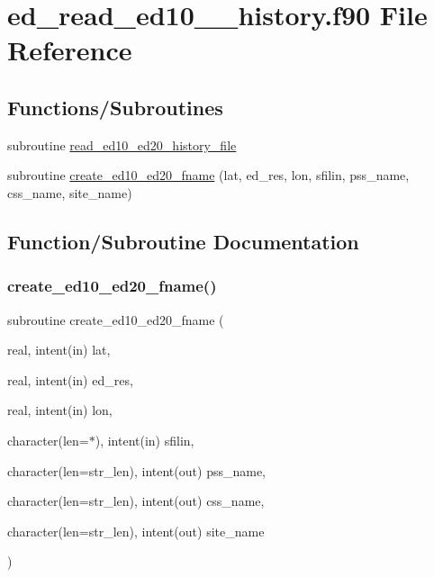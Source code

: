 \hypertarget{ed__read__ed10__20__history_8f90}{}\section{ed\+\_\+read\+\_\+ed10\+\_\+\_\+history.\+f90 File Reference}
\label{ed__read__ed10__20__history_8f90}
\subsection*{Functions/\+Subroutines}
\begin{DoxyCompactItemize}
\item 
subroutine \hyperlink{ed__read__ed10__20__history_8f90_ae4e49e107b22c0bb119ee87348e513b8}{read\+\_\+ed10\+\_\+ed20\+\_\+history\+\_\+file}
\item 
subroutine \hyperlink{ed__read__ed10__20__history_8f90_ae83216c2ec17a440e61fabc9fa0f5ece}{create\+\_\+ed10\+\_\+ed20\+\_\+fname} (lat, ed\+\_\+res, lon, sfilin, pss\+\_\+name, css\+\_\+name, site\+\_\+name)
\end{DoxyCompactItemize}


\subsection{Function/\+Subroutine Documentation}
\mbox{\label{ed__read__ed10__20__history_8f90_ae83216c2ec17a440e61fabc9fa0f5ece}} 
\subsubsection{\texorpdfstring{create\+\_\+ed10\+\_\+ed20\+\_\+fname()}{create\_ed10\_ed20\_fname()}}
{\footnotesize\ttfamily subroutine create\+\_\+ed10\+\_\+ed20\+\_\+fname (\begin{DoxyParamCaption}\item[{real, intent(in)}]{lat,  }\item[{real, intent(in)}]{ed\+\_\+res,  }\item[{real, intent(in)}]{lon,  }\item[{character(len=$\ast$), intent(in)}]{sfilin,  }\item[{character(len=str\+\_\+len), intent(out)}]{pss\+\_\+name,  }\item[{character(len=str\+\_\+len), intent(out)}]{css\+\_\+name,  }\item[{character(len=str\+\_\+len), intent(out)}]{site\+\_\+name }\end{DoxyParamCaption})}


